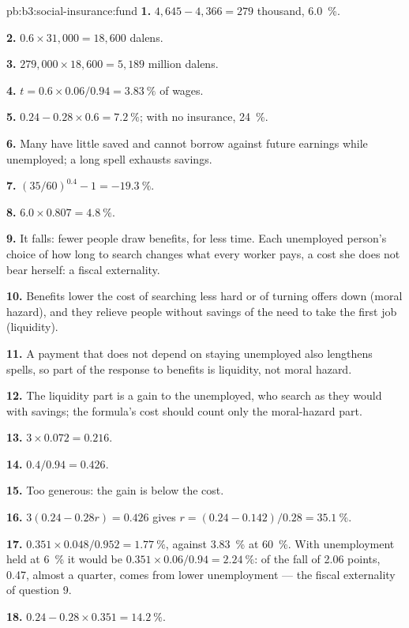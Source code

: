 \begin{solution}{pb:b3:social-insurance:fund}
\textbf{1.} $4{,}645 - 4{,}366 = 279$ thousand, 6.0~\%.

\textbf{2.} $0.6 \times 31{,}000 = 18{,}600$ dalens.

\textbf{3.} $279{,}000 \times 18{,}600 = 5{,}189$ million dalens.

\textbf{4.} $t = 0.6 \times 0.06/0.94 = 3.83~\%$ of wages.

\textbf{5.} $0.24 - 0.28 \times 0.6 = 7.2~\%$; with no insurance, 24~\%.

\textbf{6.} Many have little saved and cannot borrow against future earnings while
unemployed; a long spell exhausts savings.

\textbf{7.} $(35/60)^{0.4} - 1 = -19.3~\%$.

\textbf{8.} $6.0 \times 0.807 = 4.8~\%$.

\textbf{9.} It falls: fewer people draw benefits, for less time. Each unemployed person's
choice of how long to search changes what every worker pays, a cost she does not
bear herself: a fiscal externality.

\textbf{10.} Benefits lower the cost of searching less hard or of turning offers down
(moral hazard), and they relieve people without savings of the need to take the
first job (liquidity).

\textbf{11.} A payment that does not depend on staying unemployed also lengthens
spells, so part of the response to benefits is liquidity, not moral hazard.

\textbf{12.} The liquidity part is a gain to the unemployed, who search as they would
with savings; the formula's cost should count only the moral-hazard part.

\textbf{13.} $3 \times 0.072 = 0.216$.

\textbf{14.} $0.4/0.94 = 0.426$.

\textbf{15.} Too generous: the gain is below the cost.

\textbf{16.} $3(0.24 - 0.28r) = 0.426$ gives $r = (0.24 - 0.142)/0.28 = 35.1~\%$.

\textbf{17.} $0.351 \times 0.048/0.952 = 1.77~\%$, against 3.83~\% at 60~\%. With unemployment
held at 6~\% it would be $0.351 \times 0.06/0.94 = 2.24~\%$: of the fall of 2.06 points, 0.47, almost a
quarter, comes from lower unemployment --- the fiscal externality of question 9.

\textbf{18.} $0.24 - 0.28 \times 0.351 = 14.2~\%$.


\end{solution}
